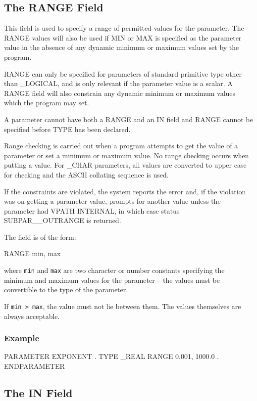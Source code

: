 \documentclass[twoside,11pt,nolof]{starlink}
\begin{document}
\subsection{The RANGE Field
\label{range}}

This field is used to specify a range of permitted values for the parameter.
The RANGE values will also be used if MIN or MAX is specified as the parameter
value in the absence of any dynamic minimum or maximum values set by the
program.

RANGE can only be specified for parameters of standard primitive type other
than \_LOGICAL, and is only relevant if the parameter value is a scalar.
A RANGE field will also constrain any dynamic minimum or maximum values which
the program may set.

A parameter cannot have both a RANGE and an IN field and RANGE cannot be
specified before TYPE has been declared.

Range checking is carried out
when a program attempts to get the value of a parameter or set a minimum
or maximum value. No range checking occurs when putting a value.
For \_CHAR parameters, all values are converted to upper case for checking and
the ASCII collating sequence is used.

If the constraints are violated, the system reports the error and, if the
violation was on getting a parameter value, prompts for
another value unless the parameter had VPATH INTERNAL, in which case status
SUBPAR\_\_OUTRANGE is returned.

The field is of the form:
\begin{terminalv}
RANGE min, max
\end{terminalv}
where \texttt{min} and \texttt{max} are two character or number
constants specifying the minimum and maximum values for the parameter -- the
values must be convertible to the type of the parameter.

If \texttt{min > max}, the value must not lie between them. The values themselves
are always acceptable.

\subsubsection*{Example}
\begin{terminalv}
PARAMETER EXPONENT
      .
   TYPE _REAL
   RANGE 0.001, 1000.0
      .
ENDPARAMETER
\end{terminalv}

\subsection{The IN Field}
\end{document}
